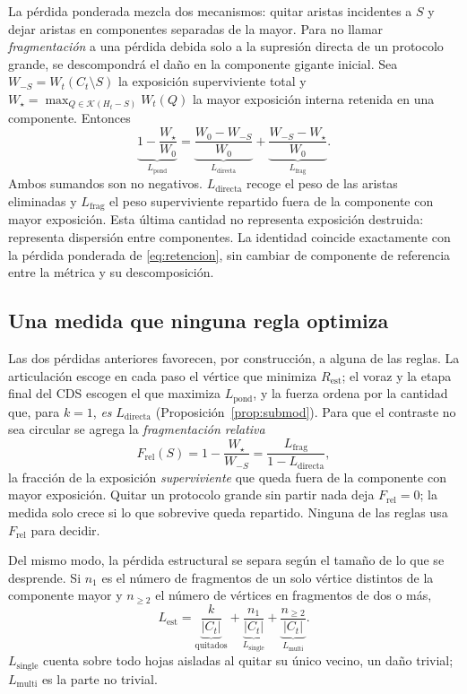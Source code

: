 \documentclass[journal]{IEEEtran}
\begin{document}
La pérdida ponderada mezcla dos mecanismos: quitar aristas incidentes a $S$ y
dejar aristas en componentes separadas de la mayor. Para no llamar
\emph{fragmentación} a una pérdida debida solo a la supresión directa de un
protocolo grande, se descompondrá el daño en la componente gigante inicial.
Sea $W_{-S}=W_t(C_t\setminus S)$ la exposición superviviente total y
$W_\star=\max_{Q\in\mathcal K(H_t-S)}W_t(Q)$ la mayor exposición interna
retenida en una componente. Entonces
\begin{equation}
\underbrace{1-\frac{W_\star}{W_0}}_{L_{\mathrm{pond}}}
=\underbrace{\frac{W_0-W_{-S}}{W_0}}_{L_{\mathrm{directa}}}
+\underbrace{\frac{W_{-S}-W_\star}{W_0}}_{L_{\mathrm{frag}}}.
\label{eq:descomposicion}
\end{equation}
Ambos sumandos son no negativos. $L_{\mathrm{directa}}$ recoge el peso de las
aristas eliminadas y $L_{\mathrm{frag}}$ el peso superviviente repartido fuera
de la componente con mayor exposición. Esta última cantidad no representa
exposición destruida: representa dispersión entre componentes. La identidad
coincide exactamente con la pérdida ponderada de \eqref{eq:retencion}, sin
cambiar de componente de referencia entre la métrica y su descomposición.

\subsection{Una medida que ninguna regla optimiza}

Las dos pérdidas anteriores favorecen, por construcción, a alguna de las reglas.
La articulación escoge en cada paso el vértice que minimiza $R_{\mathrm{est}}$;
el voraz y la etapa final del CDS escogen el que maximiza $L_{\mathrm{pond}}$, y
la fuerza ordena por la cantidad que, para $k=1$, \emph{es}
$L_{\mathrm{directa}}$ (Proposición~\ref{prop:submod}). Para que el contraste
no sea circular se agrega la \emph{fragmentación relativa}
\begin{equation}
F_{\mathrm{rel}}(S)=1-\frac{W_\star}{W_{-S}}
=\frac{L_{\mathrm{frag}}}{1-L_{\mathrm{directa}}},
\label{eq:frel}
\end{equation}
la fracción de la exposición \emph{superviviente} que queda fuera de la
componente con mayor exposición. Quitar un protocolo grande sin partir nada deja
$F_{\mathrm{rel}}=0$; la medida solo crece si lo que sobrevive queda repartido.
Ninguna de las reglas usa $F_{\mathrm{rel}}$ para decidir.

Del mismo modo, la pérdida estructural se separa según el tamaño de lo que
se desprende. Si $n_1$ es el número de fragmentos de un solo vértice distintos
de la componente mayor y $n_{\geq2}$ el número de vértices en fragmentos de dos o
más,
\begin{equation}
L_{\mathrm{est}}
=\underbrace{\frac{k}{|C_t|}}_{\text{quitados}}
+\underbrace{\frac{n_1}{|C_t|}}_{L_{\mathrm{single}}}
+\underbrace{\frac{n_{\geq2}}{|C_t|}}_{L_{\mathrm{multi}}}.
\label{eq:lest-desc}
\end{equation}
$L_{\mathrm{single}}$ cuenta sobre todo hojas aisladas al quitar su único
vecino, un daño trivial; $L_{\mathrm{multi}}$ es la parte no trivial.
\end{document}
